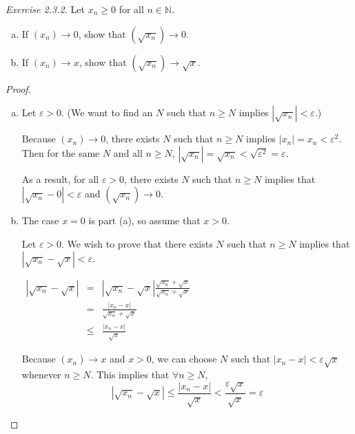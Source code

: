 \smallskip

\noindent
\emph{Exercise 2.3.2.}
Let $x_n \geq 0$ for all $n \in \mathbb{N}$. 
\begin{enumerate}[(a)]
\item If $(x_n) \to 0$, show that $(\sqrt{x_n}) \to 0$. 
\item If $(x_n) \to x$, show that $(\sqrt{x_n}) \to \sqrt{x}$.
\end{enumerate}

\begin{proof}
\begin{enumerate}[(a)]
\item Let $\varepsilon> 0$.  (We want to find an $N$ such that $n \geq N$ implies $|\sqrt{x_n}| < \varepsilon$.)

Because $(x_n) \to 0$, there exists $N$ such that $n \geq N$ implies $|x_n|= x_n < \varepsilon^2$.  Then for the same $N$ and all $n \geq N$, $|\sqrt{x_n}| = \sqrt{x_n} < \sqrt{\varepsilon^2} = \varepsilon$.

As a result, for all $\varepsilon> 0$, there exists $N$ such that $n \geq N$ implies that $|\sqrt{x_n}- 0| < \varepsilon$ and $(\sqrt{x_n}) \to 0$.



\item The case $x = 0$ is part (a), so assume that $x > 0$.

Let $\varepsilon > 0$.  We wish to prove that there exists $N$ such that $n \geq N$ implies that $|\sqrt{x_n} - \sqrt{x}| < \varepsilon$.  

$\begin{array} {lcl} 
|\sqrt{x_n} -  \sqrt{x}|& = &|\sqrt{x_n} -  \sqrt{x}| \frac{\sqrt{x_n} +  \sqrt{x}}{\sqrt{x_n} +  \sqrt{x}}\\ 
	& = & \frac{|x_n -  x|}{\sqrt{x_n} +  \sqrt{x}}\\
&\leq	& \frac{|x_n -  x|}{\sqrt{x}}
    \end{array}$
    
    Because $(x_n ) \to x$ and $x>0$, we can choose $N$ such that $|x_n -x | <\varepsilon \sqrt{x}$ whenever $n \geq N$.  This implies that $\forall n \geq N$,
    \[		|\sqrt{x_n} - \sqrt{x}| \leq \frac{|x_n -  x|}{\sqrt{x}} < \frac{\varepsilon \sqrt{x}}{\sqrt{x}} = \varepsilon	\]

\end{enumerate} \end{proof}

\smallskip

